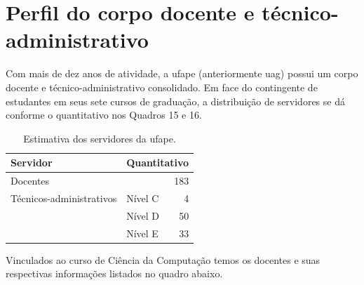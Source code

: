 \documentclass[
	12pt,				%
	openright,			%
  oneside,     %
	a4paper,			%
 hyphens,
	chapter=TITLE,		%
	english,			%
	french,				%
	spanish,			%
	brazil				%
	]{abntex2}
\begin{document}
\chapter{Perfil do corpo docente e técnico-administra\-ti\-vo}

Com mais de dez anos de atividade, a \acrshort{ufape} (anteriormente \acrshort{uag}) possui um corpo docente e técnico-administrativo consolidado. Em face do contingente de estudantes em seus sete cursos de graduação, a distribuição de servidores se dá conforme o quantitativo nos Quadros 15 e 16.

\begin{center}
  
  \begin{scriptsize}
    \begin{longtable}{llr}
      \caption{\label{quadro:estimativa-servidores-ufape}Estimativa dos servidores da \acrshort{ufape}.}\\
  \toprule
  \textbf{Servidor} & \multicolumn{2}{l}{\textbf{Quantitativo}}\\ 
    \midrule
    Docentes                 & \multicolumn{2}{r}{183} \\ \midrule
    Técnicos-administrativos & Nível C & 4 \\ 
                             & Nível D & 50 \\ 
                             & Nível E & 33 \\
    \bottomrule
\end{longtable}
\end{scriptsize}      
\end{center}
Vinculados ao curso de Ciência da Computação temos os docentes e suas respectivas informações listados no quadro abaixo.
\end{document}
